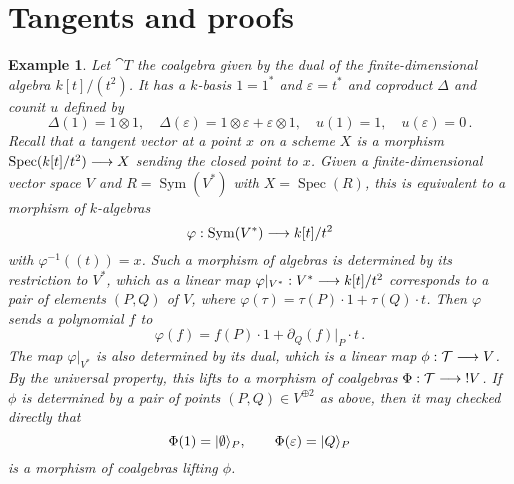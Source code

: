 \documentclass[english,letter paper,12pt,reqno]{article}
\DeclarePairedDelimiter\ket{\lvert}{\rangle}
\theoremstyle{example}
\newtheorem{definition}[theorem]{Definition}
\newtheorem{example}[theorem]{Example}
\def\vacu{\ket{\emptyset}}
\DeclareMathOperator{\Spec}{Spec}
\DeclareMathOperator{\Sym}{Sym}
\begin{document}
\section{Tangents and proofs}\label{section:example_lifting}





\begin{example}\label{example:tangent_coalgebra} Let $\cat{T}$ the coalgebra given by the dual of the finite-dimensional algebra $k[t]/(t^2)$. It has a $k$-basis $1 = 1^*$ and $\varepsilon = t^*$ and coproduct $\Delta$ and counit $u$ defined by
\[
\Delta(1) = 1 \otimes 1, \quad \Delta( \varepsilon ) = 1 \otimes \varepsilon + \varepsilon \otimes 1, \quad u(1) = 1, \quad u(\varepsilon) = 0\,.
\]
Recall that a tangent vector at a point $x$ on a scheme $X$ is a morphism $\Spec(k[t]/t^2) \lto X$ sending the closed point to $x$. Given a finite-dimensional vector space $V$ and $R = \Sym(V^*)$ with $X = \Spec(R)$, this is equivalent to a morphism of $k$-algebras
\[
\varphi: \Sym(V^*) \lto k[t]/t^2
\]
with $\varphi^{-1}( (t) ) = x$. Such a morphism of algebras is determined by its restriction to $V^*$, which as a linear map $\varphi|_{V^*}: V^* \longrightarrow k[t]/t^2$ corresponds to a pair of elements $(P, Q)$ of $V$, where $\varphi( \tau ) = \tau(P) \cdot 1 + \tau(Q) \cdot t$. Then $\varphi$ sends a polynomial $f$ to
\[
\varphi(f) = f(P) \cdot 1 + \partial_Q( f )|_P \cdot t\,.
\]
The map $\varphi|_{V^*}$ is also determined by its dual, which is a linear map $\phi: \mathcal{T} \longrightarrow V$. By the universal property, this lifts to a morphism of coalgebras $\Phi: \mathcal{T} \longrightarrow {!}V$. If $\phi$ is determined by a pair of points $(P,Q) \in V^{\oplus 2}$ as above, then it may checked directly that
\[
\Phi( 1 ) = \vacu_P, \qquad \Phi( \varepsilon ) = \ket{ Q }_P
\]
is a morphism of coalgebras lifting $\phi$.
\end{example}
\end{document}
